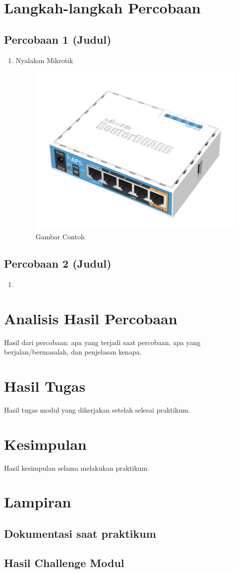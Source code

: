 \section{Langkah-langkah Percobaan}

\subsection{Percobaan 1 (Judul)}
\begin{enumerate}
	\item Nyalakan Mikrotik
	\begin{figure}[H]
		\centering
		\includegraphics[width=0.5\linewidth]{P1/img/Mikrotik.png}
		\caption{Gambar Contoh}
		\label{fig:gambar1}
	\end{figure}
\end{enumerate}

\subsection{Percobaan 2 (Judul)}
\begin{enumerate}
	\item 
\end{enumerate}
\section{Analisis Hasil Percobaan}
 Hasil dari percobaan: apa yang terjadi saat percobaan, apa yang berjalan/bermasalah, dan penjelasan kenapa.
\section{Hasil Tugas}
 Hasil tugas modul yang dikerjakan setelah selesai praktikum.
\section{Kesimpulan}
Hasil kesimpulan selama melakukan praktikum.
\section{Lampiran}
\subsection{Dokumentasi saat praktikum}
\subsection{Hasil Challenge Modul}
